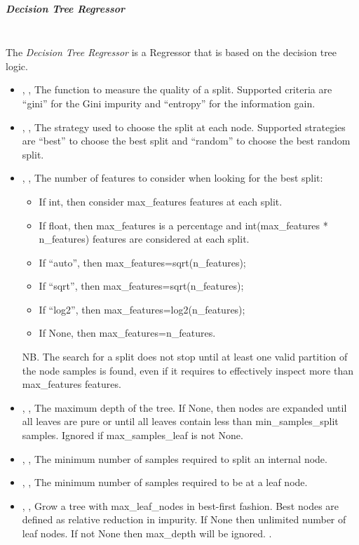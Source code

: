 \subparagraph{Decision Tree Regressor}
\mbox{}
\\The \textit{Decision Tree Regressor} is a Regressor that is based on the
decision tree logic.
%
\begin{itemize}
  \item {} , ,
  The function to measure the quality of a split.
  Supported criteria are ``gini'' for the Gini impurity and ``entropy'' for the
  information gain.
  \item {} , ,
  The strategy used to choose the split at each node.
  Supported strategies are ``best'' to choose the best split and ``random'' to
  choose the best random split.
  \item {} , ,
  The number of features to consider when looking for the best split:
\begin{itemize}
    \item If int, then consider max\_features features at each split.
    \item If float, then max\_features is a percentage and int(max\_features *
    n\_features) features are considered at each split.
    \item If “auto”, then max\_features=sqrt(n\_features);
    \item If “sqrt”, then max\_features=sqrt(n\_features);
    \item If “log2”, then max\_features=log2(n\_features);
    \item If None, then max\_features=n\_features.
\end{itemize}
  NB.
  The search for a split does not stop until at least one valid partition of the
  node samples is found, even if it requires to effectively inspect more than
  max\_features features.
  \\
  \item {} , ,
  The maximum depth of the tree.
  If None, then nodes are expanded until all leaves are pure or until all leaves
  contain less than min\_samples\_split samples.
  Ignored if max\_samples\_leaf is not None.
  \item {} , ,
  The minimum number of samples required to split an internal node.
  \item {} , ,
  The minimum number of samples required to be at a leaf node.
  \item {} , ,
  Grow a tree with max\_leaf\_nodes in best-first fashion.
  Best nodes are defined as relative reduction in impurity.
  If None then unlimited number of leaf nodes.
  If not None then max\_depth will be ignored.
  .
\end{itemize}

